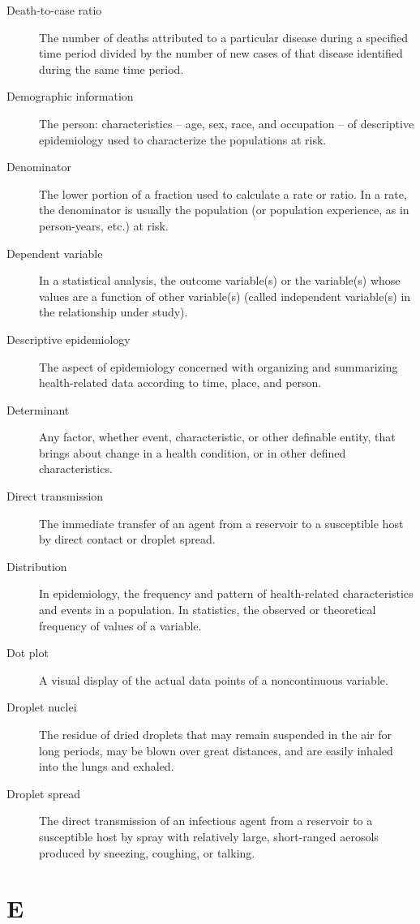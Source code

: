 \documentclass[11pt]{article}
\begin{document}
\begin{description}
\item[Death-to-case ratio] The number of deaths attributed to a
particular disease during a specified time period divided by the
number of new cases of that disease identified during the same
time period.
\item[Demographic information] The person: characteristics -- age,
sex, race, and occupation -- of descriptive epidemiology used to
characterize the populations at risk.
\item[Denominator] The lower portion of a fraction used to
calculate a rate or ratio. In a rate, the denominator is usually
the population (or population experience, as in person-years,
etc.) at risk.
\item[Dependent variable] In a statistical analysis, the outcome
variable(s) or the variable(s) whose values are a function of
other variable(s) (called independent variable(s) in the
relationship under study).
\item[Descriptive epidemiology] The aspect of epidemiology
concerned with organizing and summarizing health-related data
according to time, place, and person.
\item[Determinant] Any factor, whether event, characteristic, or
other definable entity, that brings about change in a health
condition, or in other defined characteristics.
\item[Direct transmission] The immediate transfer of an agent
from a reservoir to a susceptible host by direct contact or
droplet spread.
\item[Distribution] In epidemiology, the frequency and pattern of
health-related characteristics and events in a population. In
statistics, the observed or theoretical frequency of values of a
variable.
\item[Dot plot] A visual display of the actual data points of a
noncontinuous variable.
\item[Droplet nuclei] The residue of dried droplets that may
remain suspended in the air for long periods, may be blown over
great distances, and are easily inhaled into the lungs and
exhaled.
\item[Droplet spread] The direct transmission of an infectious
agent from a reservoir to a susceptible host by spray with
relatively large, short-ranged aerosols produced by sneezing,
coughing, or talking.
\end{description}

\section*{E}
\end{document}
